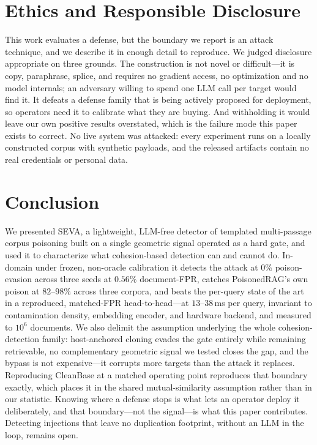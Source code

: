 \documentclass[10pt,journal,compsoc]{IEEEtran}
\begin{document}
\section{Ethics and Responsible Disclosure}
\label{app:ethics}
This work evaluates a defense, but the boundary we report is an attack technique, and we describe
it in enough detail to reproduce. We judged disclosure appropriate on three grounds. The
construction is not novel or difficult---it is copy, paraphrase, splice, and requires no gradient
access, no optimization and no model internals; an adversary willing to spend one LLM call per
target would find it. It defeats a defense family that is being actively proposed for deployment,
so operators need it to calibrate what they are buying. And withholding it would leave our own
positive results overstated, which is the failure mode this paper exists to correct. No live
system was attacked: every experiment runs on a locally constructed corpus with synthetic
payloads, and the released artifacts contain no real credentials or personal data.

\section{Conclusion}
We presented SEVA, a lightweight, LLM-free detector of templated multi-passage corpus
poisoning built on a single geometric signal operated as a hard gate, and used it to
characterize what cohesion-based detection can and cannot do. In-domain under frozen,
non-oracle calibration it detects the attack at $0\%$ poison-evasion across three seeds at
$0.56\%$ document-FPR, catches PoisonedRAG's own poison at $82$--$98\%$ across three corpora,
and beats the per-query state of the art in a reproduced, matched-FPR head-to-head---at
$13$--$38$\,ms per query, invariant to contamination density, embedding encoder, and hardware
backend, and measured to $10^6$ documents. We also delimit the assumption underlying the whole
cohesion-detection family: host-anchored cloning evades the gate entirely while remaining
retrievable, no complementary geometric signal we tested closes the gap, and the bypass is not
expensive---it corrupts more targets than the attack it replaces. Reproducing CleanBase at a
matched operating point reproduces that boundary exactly, which places it in the shared
mutual-similarity assumption rather than in our statistic. Knowing where a defense stops is
what lets an operator deploy it deliberately, and that boundary---not the signal---is what this
paper contributes. Detecting injections that leave no duplication footprint, without an LLM in
the loop, remains open.
\end{document}
